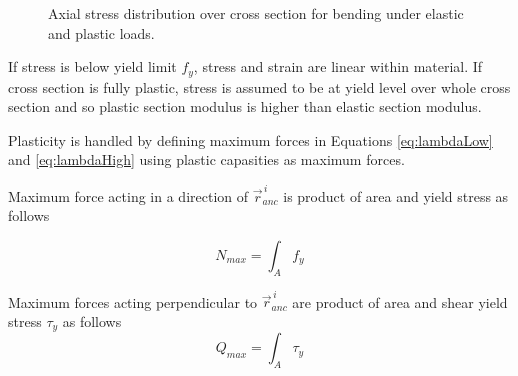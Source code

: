 \begin{figure}[htb!]
\centering
{}
\hspace{1cm}
\caption{Axial stress distribution over cross section for bending under elastic and plastic loads.}
\label{fig:wp}
\end{figure}

If stress is below yield limit $f_y$, stress and strain are linear within material.
If cross section is fully plastic, stress is assumed to be at yield level over whole cross section and 
so plastic section modulus is higher than elastic section modulus.

Plasticity is handled by defining maximum forces
in Equations \ref{eq:lambdaLow} and  
\ref{eq:lambdaHigh} using plastic capasities as maximum forces.

Maximum force acting in a direction of $\vec{r}_{anc}^{\,i} $
is product of area and yield stress as follows

\begin{equation} \label{eq:fN}
N_{max}= \int_A f_y
\end{equation}

Maximum forces acting perpendicular to $\vec{r}_{anc}^{\,i} $
are product of area and shear yield stress $\tau_y$ as follows
\begin{equation} \label{eq:fQ}
Q_{max}= \int_A \tau_y
\end{equation}

